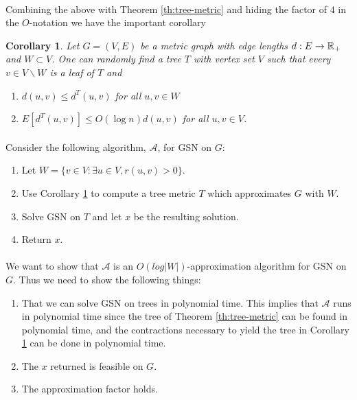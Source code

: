 \documentclass[letterpaper,12pt,oneside,onecolumn]{article}
\newcommand{\cA}{\mathcal{A}} \newcommand{\cB}{\mathcal{B}}
\newtheorem{corollary}[fact]{Corollary}
\begin{document}
\paragraph{}
Combining the above with Theorem \ref{th:tree-metric} and hiding the factor of $4$ in the $O$-notation we have the important corollary
\begin{corollary}\label{cor:tree-metric}
Let $G = (V,E)$ be a metric graph with edge lengths $d:E\rightarrow \mathbb{R}_+$ and $W \subset V$. One can randomly find a tree $T$ with vertex set $V$ such that every $v \in V\backslash W$ is a leaf of $T$ and
\begin{enumerate}
\item $d(u,v) \leq d^T(u,v)$ for all $u,v\in W$
\item $E[d^T(u,v)] \leq O(\log n) d(u,v)$ for all $u,v\in V$.
\end{enumerate}
\end{corollary}
\paragraph{}
Consider the following algorithm, $\cA$, for GSN on $G$:
\begin{enumerate}
\item Let $W = \{v \in V: \exists u \in V, r(u,v) > 0\}$.
\item Use Corollary \ref{cor:tree-metric} to compute a tree metric $T$ which approximates $G$ with $W$.
\item Solve GSN on $T$ and let $x$ be the resulting solution.
\item Return $x$.
\end{enumerate}
\paragraph{}
We want to show that $\cA$ is an $O(log |W|)$-approximation algorithm for GSN on $G$. Thus we need to show the following things:
\begin{enumerate}
\item That we can solve GSN on trees in polynomial time. This implies that $\cA$ runs in polynomial time since the tree of Theorem \ref{th:tree-metric} can be found in polynomial time, and the contractions necessary to yield the tree in Corollary \ref{cor:tree-metric} can be done in polynomial time. 
\item The $x$ returned is feasible on $G$.
\item The approximation factor holds.
\end{enumerate}
\end{document}
